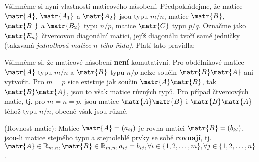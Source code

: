       
      Všimněme si nyní vlastností maticového násobení. Předpokládejme, že matice \(\matr{A}\),
      \(\matr{A_1}\) a \(\matr{A_2}\) jsou typu \(m/n\), matice \(\matr{B}\), \(\matr{B_1}\) a
      \(\matr{B_2}\) typu \(n/p\), matice \(\matr{C}\) typu \(p/q\). Označme jako \(\matr{E_n}\)
      čtvercovou diagonální matici, jejíž diagonálu tvoří samé jedničky (takzvaná \emph{jednotková
      matice \(n\)-tého řádu)}. Platí tato pravidla:
      
      \begin{table}[ht!]
        \centering
      \end{table}
      
      Všimněme si, že maticové násobení \textbf{není} komutativní. Pro obdélníkové matice
      \(\matr{A}\) typu \(m/n\) a \(\matr{B}\) typu \(n/p\) nelze součin \(\matr{B}\matr{A}\) ani
      vytvořit. Pro \(m = p\) sice existuje jak součin \(\matr{A}\matr{B}\), tak
      \(\matr{B}\matr{A}\), jsou to však matice různých typů. Pro případ čtvercových matic, tj. pro
      \(m = n = p\), jsou matice \(\matr{A}\matr{B}\) i \(\matr{B}\matr{A}\) téhož typu \(n/n\),
      obecně však jsou různé.
      
      \begin{definition}\label{rovnost_matic}
        (Rovnost matic):  Matice \(\matr{A} = \left(a_{ij}\right)\) je rovna matici \(\matr{B}=
        \left(b_{kl}\right)\), jsou-li matice stejného typu a stejnolehlé prvky se sobě
        \textbf{rovnají}, tj. \(\matr{A} \in \mathbb{R}_{m,n}, \matr{B}\in\mathbb{R}_{m,n}, 
        a_{ij} = b_{ij}, \forall i\in\lbrace1,2,\ldots,m\rbrace, \forall j\in\lbrace1,2, \ldots 
        ,n\rbrace\).
      \end{definition}

